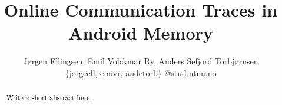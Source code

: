 \documentclass{sig-alternate-05-2015}
\begin{document}
\title{Online Communication Traces in Android Memory}

\author{
J{\o}rgen Ellingsen, Emil Volckmar Ry, Anders Sefjord Torbj{\o}rnsen \\
\{jorgeell, emivr, andetorb\} @stud.ntnu.no
}

\maketitle
\begin{abstract}
Write a short abstract here.
\end{abstract}
















  
\end{document}
